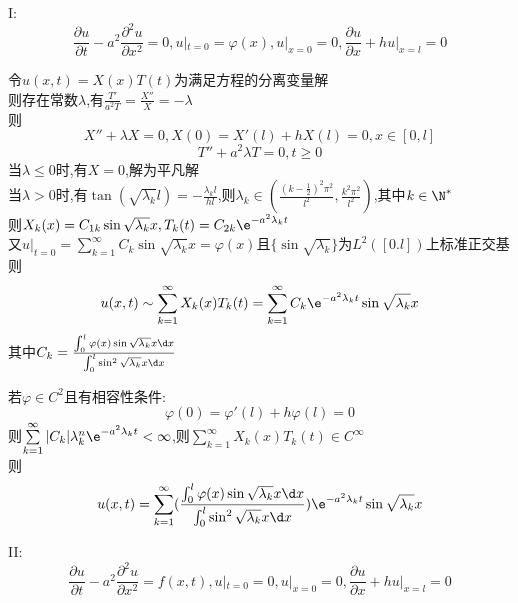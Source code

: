 I:\[\frac{\partial u}{\partial t}-a^2\frac{\partial^2u}{\partial x^2}=0,u|_{t=0}=\varphi(x),u|_{x=0}=0,\frac{\partial u}{\partial x}+h u|_{x=l}=0\]

\begin{jie}
令$u(x,t)=X(x)T(t)$为满足方程的分离变量解\\
则存在常数$\lambda$,有$\frac{T'}{a^2T}=\frac{X''}{X}=-\lambda$\\
则
\[X''+\lambda X=0,X(0)=X'(l)+hX(l)=0,x\in [0,l]\]
\[T''+a^2\lambda T=0,t\geq 0\] 
当$\lambda\leq 0$时,有$X=0$,解为平凡解\\
当$\lambda> 0$时,有$\tan(\sqrt{\lambda_k}l)=-\frac{\lambda_kl}{hl}$,则$\lambda_k\in(\frac{(k-\frac{1}{2})^2\pi^2}{l^2},\frac{k^2\pi^2}{l^2})$,其中$k\in\N^*$\\
则$X_{k}(x)=C_{1k}\sin\sqrt{\lambda_k}x,T_{k}(t)=C_{2k}\e^{-a^2\lambda_k t}$\\
又$u|_{t=0}=\sum\limits_{k=1}^{\infty}C_{k}\sin\sqrt{\lambda_k}x=\varphi(x)$且$\{\sin\sqrt{\lambda_k}\}$为$L^2([0.l])$上标准正交基\\
则\[u(x,t)\sim \sum\limits_{k=1}^{\infty}X_k(x)T_{k}(t)=\sum\limits_{k=1}^{\infty}C_k\e^{-a^2\lambda_k t}\sin\sqrt{\lambda_k}x\]
其中$C_{k}=\frac{\int_{0}^{l}\varphi(x)\sin\sqrt{\lambda_k}x\d x}{\int_{0}^{l}\sin^2\sqrt{\lambda_k}x\d x}$
\end{jie}

\begin{dingli*}
若$\varphi\in C^2$且有相容性条件:
\[\varphi(0)=\varphi'(l)+h\varphi(l)=0\]
则$\sum\limits_{k=1}^{\infty}|C_{k}|\lambda_{k}^{n}\e^{-a^2\lambda_k t}<\infty$,则$\sum\limits_{k=1}^{\infty}X_k(x)T_{k}(t)\in C^\infty$\\
则\[u(x,t)=\sum\limits_{k=1}^{\infty}(\frac{\int_{0}^{l}\varphi(x)\sin\sqrt{\lambda_k}x\d x}{\int_{0}^{l}\sin^2\sqrt{\lambda_k}x\d x})\e^{-a^2\lambda_k t}\sin\sqrt{\lambda_k}x\]
\end{dingli*}

II:\[\frac{\partial u}{\partial t}-a^2\frac{\partial^2u}{\partial x^2}=f(x,t),u|_{t=0}=0,u|_{x=0}=0,\frac{\partial u}{\partial x}+h u|_{x=l}=0\]

